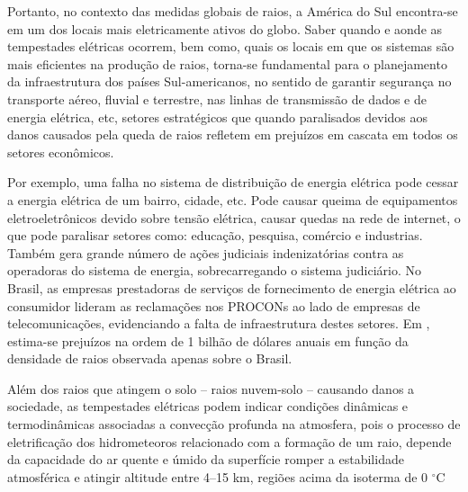 Portanto, no contexto das medidas globais de raios, a América do Sul encontra-se em um dos locais mais eletricamente ativos do globo. Saber quando e aonde as tempestades elétricas ocorrem, bem como, quais os locais em que os sistemas são mais eficientes na produção de raios, torna-se fundamental para o planejamento da infraestrutura dos países Sul-americanos, no sentido de garantir segurança no transporte aéreo, fluvial e terrestre, nas linhas de transmissão de dados e de energia elétrica, etc, setores estratégicos que quando paralisados devidos aos danos causados pela queda de raios refletem em prejuízos em cascata em todos os setores econômicos. 

Por exemplo, uma falha no sistema de distribuição de energia elétrica pode cessar a energia elétrica de um bairro, cidade, etc. Pode causar queima de equipamentos eletroeletrônicos devido sobre tensão elétrica, causar quedas na rede de internet, o que pode paralisar  setores como: educação, pesquisa, comércio e industrias. Também gera grande número de ações judiciais indenizatórias contra as operadoras do sistema de energia, sobrecarregando o sistema judiciário. No Brasil, as empresas prestadoras de serviços de  fornecimento de energia elétrica ao consumidor lideram as reclamações nos PROCONs ao lado de empresas de telecomunicações, evidenciando a falta de infraestrutura destes setores. Em , estima-se prejuízos na ordem de 1 bilhão de dólares anuais em função da densidade de raios observada apenas sobre o Brasil. 
  
    

Além dos raios que atingem o solo -- raios nuvem-solo -- causando danos a sociedade, as tempestades elétricas podem indicar condições dinâmicas e termodinâmicas associadas a convecção profunda na atmosfera, pois o processo de eletrificação dos hidrometeoros relacionado com a formação de um raio, depende da capacidade do ar quente e úmido da superfície romper a estabilidade atmosférica e atingir altitude entre 4--15 km, regiões acima da isoterma de 0 $^{\circ}$C \cite{doswell2001,zipser2006}


